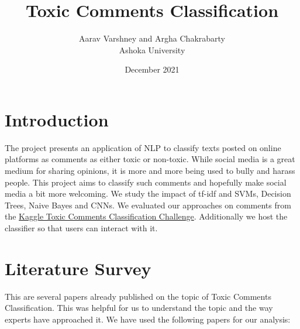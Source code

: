 \documentclass[11pt]{article}
\title{Toxic Comments Classification}
\author{Aarav Varshney and Argha Chakrabarty\\
\AND
\AND
	Ashoka University\\
}
\date{December 2021}
\begin{document}
\maketitle

\newpage
\tableofcontents
\thispagestyle{empty}

\newpage
\thispagestyle{empty}

\setcounter{page}{1}
\section{Introduction}
The project presents an application of NLP to classify texts posted on online platforms as
comments as either toxic or non-toxic. While social media is a great medium for sharing opinions,
it is more and more being used to bully and harass people. This project aims to classify such comments
and hopefully make social media a bit more welcoming. We study the impact of tf-idf and SVMs, Decision Trees, Naive Bayes and CNNs.
We evaluated our approaches on comments from the \href{https://www.kaggle.com/c/jigsaw-toxic-comment-classification-challenge}{Kaggle Toxic Comments Classification Challenge}. Additionally
we host the classifier so that users can interact with it.


\section{Literature Survey}
\label{sec:headings}
This are several papers already published on the topic of Toxic Comments Classification. This was helpful for us to understand the topic and the way experts have approached it.
We have used the following papers for our analysis: 
\end{document}
